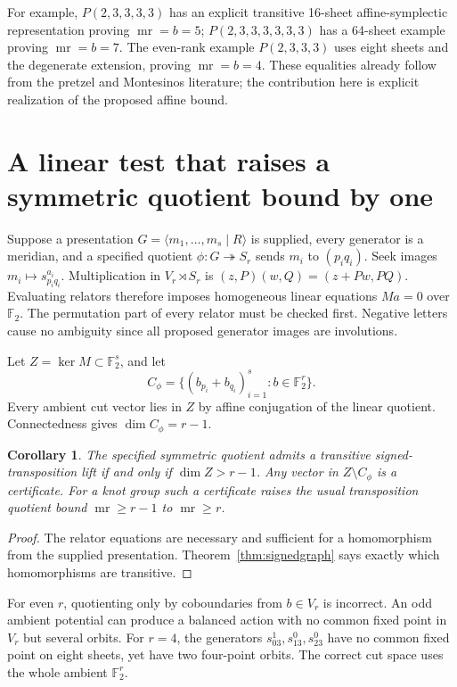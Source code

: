\documentclass[11pt]{article}
\newtheorem{corollary}[theorem]{Corollary}
\newcommand{\F}{\mathbb F}
\newcommand{\mr}{\operatorname{mr}}
\begin{document}
For example, $P(2,3,3,3,3)$ has an explicit transitive 16-sheet
affine-symplectic representation proving $\mr=b=5$;
$P(2,3,3,3,3,3,3)$ has a 64-sheet example proving $\mr=b=7$.
The even-rank example $P(2,3,3,3)$ uses eight sheets and the degenerate
extension, proving $\mr=b=4$.
These equalities already follow from the pretzel and Montesinos literature;
the contribution here is explicit realization of the proposed affine bound.

\section{A linear test that raises a symmetric quotient bound by one}

Suppose a presentation $G=\langle m_1,\ldots,m_s\mid R\rangle$ is supplied,
every generator is a meridian, and a specified quotient
$\phi:G\twoheadrightarrow S_r$ sends $m_i$ to $(p_iq_i)$.
Seek images $m_i\mapsto s_{p_iq_i}^{a_i}$.
Multiplication in $V_r\rtimes S_r$ is
$(z,P)(w,Q)=(z+Pw,PQ)$. Evaluating relators therefore imposes homogeneous
linear equations $Ma=0$ over $\F_2$. The permutation part of every
relator must be checked first. Negative letters cause no ambiguity since
all proposed generator images are involutions.

Let $Z=\ker M\subset\F_2^s$, and let
\[
 C_\phi=\{(b_{p_i}+b_{q_i})_{i=1}^s:b\in\F_2^r\}.
\]
Every ambient cut vector lies in $Z$ by affine conjugation of the linear
quotient. Connectedness gives $\dim C_\phi=r-1$.
\begin{corollary}\label{cor:algorithm}
The specified symmetric quotient admits a transitive signed-transposition
lift if and only if $\dim Z>r-1$. Any vector in $Z\setminus C_\phi$ is
a certificate. For a knot group such a certificate raises the usual
transposition quotient bound $\mr\ge r-1$ to $\mr\ge r$.
\end{corollary}
\begin{proof}
The relator equations are necessary and sufficient for a homomorphism
from the supplied presentation. Theorem~\ref{thm:signedgraph} says exactly
which homomorphisms are transitive.
\end{proof}

For even $r$, quotienting only by coboundaries from $b\in V_r$ is
incorrect. An odd ambient potential can produce a balanced action with
no common fixed point in $V_r$ but several orbits. For $r=4$, the
generators $s_{03}^1,s_{13}^0,s_{23}^0$ have no common fixed point on eight
sheets, yet have two four-point orbits. The correct cut space uses the
whole ambient $\F_2^r$.
\end{document}
